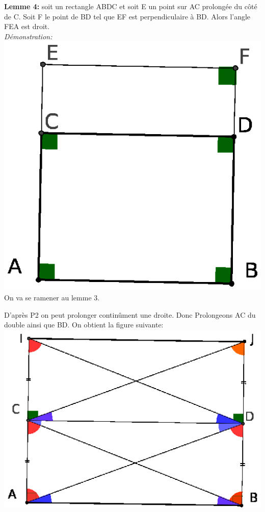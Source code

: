 \documentclass[a4paper, 12pt, twoside]{book}
\begin{document}
\textbf{Lemme 4:}  soit un rectangle ABDC et soit E un point sur AC prolongée du côté de C. Soit F le point de BD tel que EF est perpendiculaire à BD. Alors l'angle FEA est droit.\\

\textit{Démonstration:}\\

  \includegraphics[scale=0.7]{figures/saccheri4.eps}\\
  
  On va se ramener au lemme 3.\
  
  D'après P2 on peut prolonger continûment une droite. Donc Prolongeons AC du double ainsi que BD. On obtient la figure suivante:\\
  
   \includegraphics[scale=0.9]{figures/saccheri5.eps}\\
   
\end{document}
